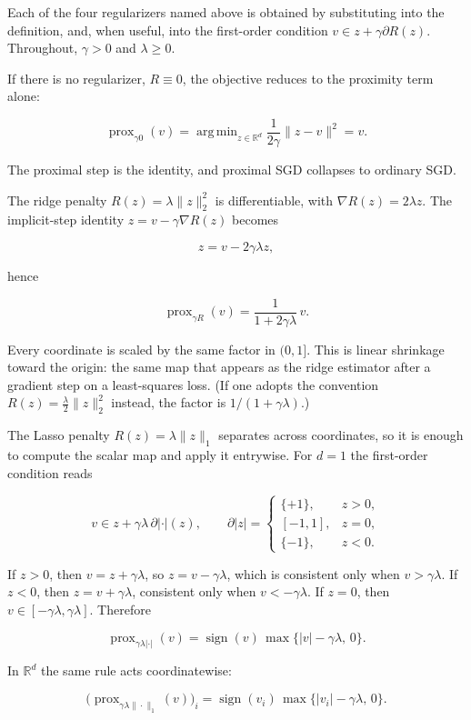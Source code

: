 \documentclass[11pt,a4paper]{article}
\DeclareMathOperator*{\argmin}{arg\,min}
\DeclareMathOperator{\prox}{prox}
\theoremstyle{definition}
\begin{document}
\begin{example}\label{ex:prox-basic}
Each of the four regularizers named above is obtained by substituting into the definition, and, when useful, into the first-order condition $v\in z+\gamma\partial R(z)$. Throughout, $\gamma>0$ and $\lambda\geq0$.

If there is no regularizer, $R\equiv0$, the objective reduces to the proximity term alone:

\[
\prox_{\gamma0}(v)
=\argmin_{z\in\mathbb{R}^d}\frac{1}{2\gamma}\|z-v\|^2
=v.
\]

The proximal step is the identity, and proximal SGD collapses to ordinary SGD.

The ridge penalty $R(z)=\lambda\|z\|_2^2$ is differentiable, with $\nabla R(z)=2\lambda z$. The implicit-step identity $z=v-\gamma\nabla R(z)$ becomes

\[
z=v-2\gamma\lambda z,
\]

hence

\[
\prox_{\gamma R}(v)
=\frac{1}{1+2\gamma\lambda}\,v.
\]

Every coordinate is scaled by the same factor in $(0,1]$. This is linear shrinkage toward the origin: the same map that appears as the ridge estimator after a gradient step on a least-squares loss. (If one adopts the convention $R(z)=\frac{\lambda}{2}\|z\|_2^2$ instead, the factor is $1/(1+\gamma\lambda)$.)

The Lasso penalty $R(z)=\lambda\|z\|_1$ separates across coordinates, so it is enough to compute the scalar map and apply it entrywise. For $d=1$ the first-order condition reads

\[
v\in z+\gamma\lambda\,\partial|\cdot|(z),
\qquad
\partial|z|
=
\begin{cases}
\{+1\}, & z>0,\\
[-1,1], & z=0,\\
\{-1\}, & z<0.
\end{cases}
\]

If $z>0$, then $v=z+\gamma\lambda$, so $z=v-\gamma\lambda$, which is consistent only when $v>\gamma\lambda$. If $z<0$, then $z=v+\gamma\lambda$, consistent only when $v<-\gamma\lambda$. If $z=0$, then $v\in[-\gamma\lambda,\gamma\lambda]$. Therefore

\[
\prox_{\gamma\lambda|\cdot|}(v)
=\operatorname{sign}(v)\,\max\bigl\{|v|-\gamma\lambda,\,0\bigr\}.
\]

In $\mathbb{R}^d$ the same rule acts coordinatewise:

\[
\bigl(\prox_{\gamma\lambda\|\cdot\|_1}(v)\bigr)_i
=\operatorname{sign}(v_i)\,\max\bigl\{|v_i|-\gamma\lambda,\,0\bigr\}.
\]


\end{example}
\end{document}
